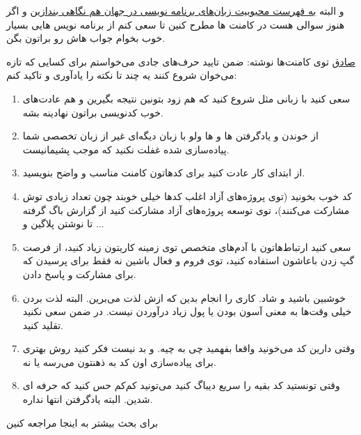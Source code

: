 و البته
\href{http://jadi.net/2010/12/\%D9\%85\%D8\%AD\%D8\%A8\%D9\%88\%D8\%A8\%D8\%AA\%D8\%B1\%DB\%8C\%D9\%86-\%D8\%B2\%D8\%A8\%D8\%A7\%D9\%86\%D9\%87\%D8\%A7\%DB\%8C-\%D8\%A8\%D8\%B1\%D9\%86\%D8\%A7\%D9\%85\%D9\%87-\%D9\%86\%D9\%88\%DB\%8C\%D8\%B3\%DB\%8C/}{به فهرست محبوبیت زبان‌های برنامه نویسی در جهان هم نگاهی بندازین}
و اگر هنوز سوالی هست در کامنت ها مطرح کنین تا سعی کنم از برنامه نویس هایی بسیار خوب بخوام جواب هاش رو براتون بگن.
\begin{mybox}
\href{http://sadeq.ir}{صادق}
توی کامنت‌ها نوشته:
ضمن تایید حرف‌های جادی می‌خواستم برای کسایی که تازه می‌خوان شروع کنند یه چند تا نکته را یادآوری و تاکید کنم:
\begin{enumerate}
	\item سعی کنید با زبانی مثل  شروع کنید که هم زود بتونین نتیجه بگیرین و هم عادت‌های خوب کدنویسی براتون نهادینه بشه.
	\item از خوندن و یادگرفتن ها و ها ولو با زبان دیگه‌ای غیر از زبان تخصصی شما پیاده‌سازی شده غفلت نکنید که موجب پشیمانیست.
	\item  از ابتدای کار عادت کنید برای کدهاتون کامنت مناسب و واضح بنویسید.
	\item کد خوب بخونید (توی پروژه‌های آزاد اغلب کدها خیلی خوبند چون تعداد زیادی توش مشارکت می‌کنند)، توی توسعه پروژه‌های آزاد مشارکت کنید از گزارش باگ گرفته تا نوشتن پلاگین و ...
	\item  سعی کنید ارتباط‌هاتون با آدم‌های متخصص توی زمینه کاریتون زیاد کنید، از فرصت گپ زدن باعاشون استفاده کنید، توی فروم و  فعال باشین نه فقط برای پرسیدن که برای مشارکت و پاسخ دادن.
	\item خوشبین باشید و شاد. کاری را انجام بدین که ازش لذت می‌برین. البته لذت بردن خیلی وقت‌ها به معنی آسون بودن یا پول زیاد درآوردن نیست. در ضمن سعی نکنید تقلید کنید.
	\item وقتی دارین کد می‌خونید واقعا بفهمید چی به چیه. و بد نیست فکر کنید روش بهتری برای پیاده‌سازی اون کد به ذهنتون می‌رسه یا نه.
	\item وقتی تونستید کد بقیه را سریع دیباگ کنید می‌تونید کم‌کم حس کنید که حرفه ای شدین. البته یادگرفتن انتها نداره.
\end{enumerate}
\end{mybox}
برای بحث بیشتر به اینجا مراجعه کنین
